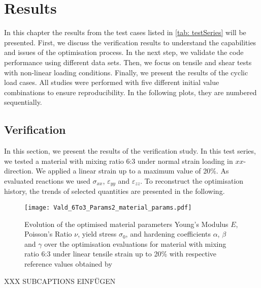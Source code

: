 \chapter{Results}\label{chap: results}

In this chapter the results from the test cases listed in \autoref{tab: testSeries} will be presented. First, we discuss the verification results to understand the capabilities and issues of the optimisation process. In the next step, we validate the code performance using different data sets. Then, we focus on tensile and shear tests with non-linear loading conditions. 
Finally, we present the results of the cyclic load cases. All studies were performed with five different initial value combinations to ensure reproducibility. In the following plots, they are numbered sequentially. 


\section{Verification}\label{sec: verification}

In this section, we present the results of the verification study. In this test series, we tested a material with mixing ratio 6:3 under normal strain loading in $xx$-direction.
We applied a linear strain up to a maximum value of 20\%. As evaluated reactions we used $\sigma_{xx}$, $\varepsilon_{yy}$ and $\varepsilon_{zz}$. To reconstruct the optimisation history, the trends of selected quantities are presented in the following.

\begin{figure}[H]
    \centering
    \texttt{[image: Vald\_6To3\_Params2\_material\_params.pdf]}
    \caption{Evolution of the optimised material parameters Young's Modulus $E$, Poisson's Ratio $\nu$, yield stress $\sigma_0$, and hardening coefficients $\alpha$, $\beta$ and $\gamma$ over the optimisation evaluations for material with mixing ratio 6:3 under linear tensile strain up to 20\% with respective reference values obtained by \citet{ries_deciphering_nodate}}
    \label{fig:verifMaterialParams}
\end{figure}

XXX SUBCAPTIONS EINFÜGEN

